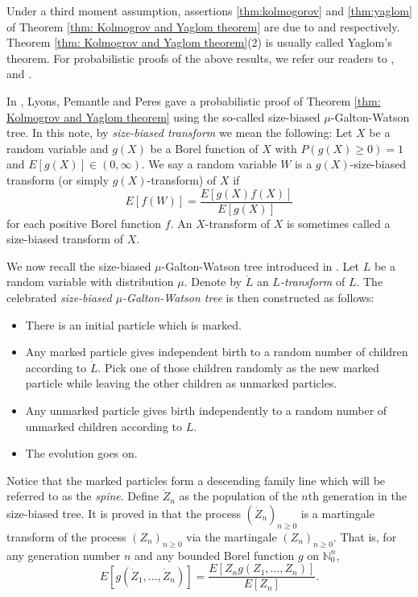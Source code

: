 \documentclass[ECP]{ejpecp} %
\begin{document}
Under a third moment assumption, assertions \eqref{thm:kolmogorov} and \eqref{thm:yaglom} of Theorem \ref{thm: Kolmogrov and Yaglom theorem} are due to \cite{kolmogorov1938losung} and \cite{yaglom1947certain} respectively.
Theorem \ref{thm: Kolmogrov and Yaglom theorem}(2) is usually called Yaglom's theorem.
For probabilistic proofs of the above results, we refer our readers to
\cite{geiger1999elementary}, \cite{geiger2000new} and \cite{lyons1995conceptual}.

In \cite{lyons1995conceptual}, Lyons, Pemantle and Peres gave a probabilistic proof of Theorem \ref{thm: Kolmogrov and Yaglom theorem} using the so-called size-biased $\mu$-Galton-Watson tree.
In this note, by \emph{size-biased transform} we mean the following:
Let $X$ be a random variable
and $g(X)$ be a Borel function of $X$ with $P(g(X) \geq 0) = 1$ and $E[g(X)]\in (0,\infty)$.
We say a random variable $W$ is
a $g(X)$-size-biased transform (or simply $g(X)$-transform) of $X$ if
\[
E[f( W )]
= \frac{ E[g(X)f(X)]}{E[g(X)]}
\]
for each positive Borel function $f$.
An $X$-transform of $X$ is sometimes called a size-biased transform of $X$.

We now recall the size-biased $\mu$-Galton-Watson tree introduced in \cite{lyons1995conceptual}.
Let $L$ be a random variable with distribution $\mu$.
Denote by $\dot L$ an \emph{$L$-transform} of $L$.
The celebrated \emph{size-biased $\mu$-Galton-Watson tree} is then constructed as follows:
\begin{itemize}
	\item
	There is an initial particle which is marked.
	\item
	Any marked particle gives independent birth to a random number of children according to $\dot L$. Pick one of those children randomly as the new marked particle while leaving the other children as unmarked particles.
	\item
	Any unmarked particle gives
	birth independently to a random number of unmarked children according to $L$.
	\item
	The evolution goes on.
\end{itemize}

Notice that the marked particles form a descending family line which will be referred to as the \emph{spine}.
Define $\dot Z_n$ as the population of the $n$th generation in the size-biased tree.
It is proved in \cite{lyons1995conceptual} that the process $(\dot Z_n)_{n\ge 0}$ is a martingale transform of the process $(Z_n)_{n\ge 0}$ via the martingale $(Z_n)_{n\ge 0}.$
That is, for any generation number $n$ and any bounded Borel function $g$ on $\mathbb N_0^{n}$,
\begin{equation}
\label{eq:htransformation}
E [ g ( \dot Z_1, \dots, \dot Z_n) ]
= \frac { E[ Z_n g( Z_1, \dots, Z_n)]} {E [ Z_n]}.
\end{equation}
\end{document}

